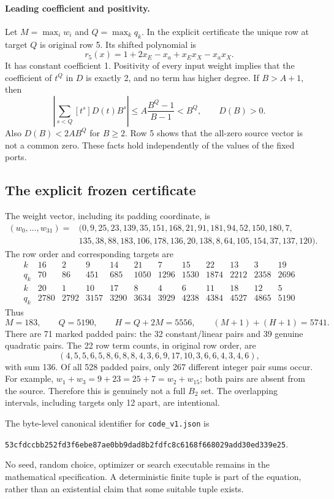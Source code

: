 \paragraph{Leading coefficient and positivity.}
Let $M=\max_i w_i$ and $Q=\max_kq_k$.  In the explicit certificate the
unique row at target $Q$ is original row 5.  Its shifted polynomial is
\[
 r_5(x)=1+2x_E-x_a+x_Ex_X-x_ax_X.
\]
It has constant coefficient 1.  Positivity of every input weight implies
that the coefficient of $t^Q$ in $D$ is exactly 2, and no term has higher
degree.  If $B>A+1$, then
\[
 \left|\sum_{s<Q}[t^s]D(t)B^s\right|
 \leq A\frac{B^Q-1}{B-1}<B^Q,
 \qquad D(B)>0.
\]
Also $D(B)<2AB^Q$ for $B\geq2$.  Row 5 shows that the all-zero source
vector is not a common zero.  These facts hold independently of the
values of the fixed ports.

\subsection{The explicit frozen certificate}
The weight vector, including its padding coordinate, is
\[
\begin{aligned}
(w_0,\ldots,w_{31})={}&(0,9,25,23,139,35,151,168,21,91,181,94,52,150,180,7,\\
&135,38,88,183,106,178,136,20,138,8,64,105,154,37,137,120).
\end{aligned}
\]
The row order and corresponding targets are
\[
\begin{array}{r|rrrrrrrrrrr}
 k&16&2&9&14&21&7&15&22&13&3&19\\
 q_k&70&86&451&685&1050&1296&1530&1874&2212&2358&2696\\[2pt]
\hline
 k&20&1&10&17&8&4&6&11&18&12&5\\
 q_k&2780&2792&3157&3290&3634&3929&4238&4384&4527&4865&5190
\end{array}
\]
Thus
\[
 M=183,\qquad Q=5190,\qquad H=Q+2M=5556,
 \qquad (M+1)+(H+1)=5741.
\]
There are 71 marked padded pairs: the 32 constant/linear pairs and
39 genuine quadratic pairs.  The 22 row term counts, in original row
order, are
\[
 (4,5,5,6,5,8,6,8,8,4,3,6,9,17,10,3,6,6,4,3,4,6),
\]
with sum 136.  Of all 528 padded pairs, only 267 different integer
pair sums occur.  For example,
$w_1+w_3=9+23=25+7=w_2+w_{15}$; both pairs are absent from the source.
Therefore this is genuinely not a full $B_2$ set.  The overlapping
intervals, including targets only 12 apart, are intentional.

The byte-level canonical identifier for \texttt{code\_v1.json} is
\begin{center}\small
\texttt{53cfdccbb252fd3f6ebe87ae0bb9dad8b2fdfc8c6168f668029add30ed339e25}.
\end{center}
No seed, random choice, optimizer or search executable remains in the
mathematical specification.  A deterministic finite tuple is part of the
equation, rather than an existential claim that some suitable tuple exists.

